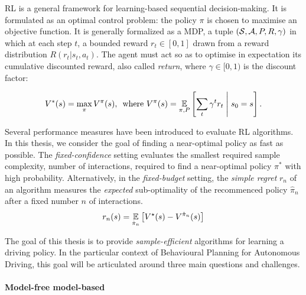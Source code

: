 \ac{RL} is a general framework for learning-based sequential decision-making. It is formulated as an optimal control problem: the policy $\pi$ is chosen to maximise an objective function. It is generally formalized as a \ac{MDP}, \ie a tuple $(\mathcal{S}, \mathcal{A}, P, R, \gamma)$ in which at each step $t$, a bounded reward $r_t\in[0, 1]$ drawn from a reward distribution $R(r_t|s_t,a_t)$. The agent must act so as to optimise in expectation its cumulative discounted reward, also called \emph{return}, where $\gamma\in[0,1)$ is the discount factor:

\begin{equation*}
V^*(s) = \max_{\pi}V^\pi(s),\, \text{ where } V^\pi(s) = \operatorname*{\mathbb{E}}_{\pi, P} \left[\sum_t \gamma^t r_t\;\middle|\; s_0 = s\right].
\end{equation*}

Several performance measures have been introduced to evaluate \ac*{RL} algorithms. In this thesis, we consider the goal of finding a near-optimal policy as fast as possible. The \emph{fixed-confidence} setting evaluates the smallest required sample complexity, \ie number of interactions, required to find a near-optimal policy $\pi^*$ with high probability. Alternatively, in the \emph{fixed-budget} setting, the \emph{simple regret} $r_n$ of an algorithm measures the \emph{expected} sub-optimality of the recommenced policy $\hat{\pi}_n$ after a fixed number $n$ of interactions.
\begin{equation*}
r_n(s) = \operatorname*{\mathbb{E}}_{\hat{\pi}_n} \left[ V^\star(s) - V^{\hat{\pi}_n}(s) \right]
\end{equation*}


The goal of this thesis is to provide \emph{sample-efficient} algorithms for learning a driving policy. In the particular context of Behavioural Planning for Autonomous Driving, this goal will be articulated around three main questions and challenges.

\paragraph{Model-free \vs model-based}

